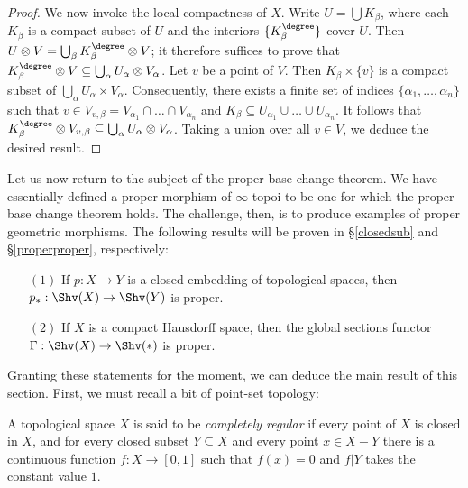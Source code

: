 \begin{proof}
We now invoke the local compactness of $X$.
Write $U = \bigcup K_{\beta}$, where each $K_{\beta}$ is a compact subset of $U$
and the interiors $\{ K^{\degree}_{\beta} \}$ cover $U$.
Then $U \otimes V = \bigcup_{\beta} K^{\degree}_{\beta} \otimes V$; it therefore suffices to prove
that $K^{\degree}_{\beta} \otimes V \subseteq \bigcup_{\alpha} U_{\alpha} \otimes V_{\alpha}$.
Let $v$ be a point of $V$. Then $K_{\beta} \times \{v\}$ is a compact subset of
$\bigcup_{ \alpha} U_{\alpha} \times V_{\alpha}$. Consequently, there exists a finite
set of indices $\{ \alpha_1, \ldots, \alpha_n \}$ such that $v \in V_{v,\beta} = V_{\alpha_1} \cap \ldots \cap V_{\alpha_n}$ and $K_{\beta} \subseteq U_{\alpha_1} \cup \ldots \cup U_{\alpha_n}$. 
It follows that $K^{\degree}_{\beta} \otimes V_{v,\beta} \subseteq \bigcup_{\alpha} U_{\alpha} \otimes V_{\alpha}$. Taking a union over all $v \in V$, we deduce the desired result.
\end{proof}

Let us now return to the subject of the proper base change theorem. We have essentially defined a proper morphism of $\infty$-topoi to be one for which the proper base change theorem holds. The challenge, then, is to produce examples of proper geometric morphisms.
The following results will be proven in \S \ref{closedsub} and \S \ref{properproper}, respectively:

\begin{itemize}
\item[$(1)$] If $p: X \rightarrow Y$ is a closed embedding of topological spaces, then
$p_{\ast}: \Shv(X) \rightarrow \Shv(Y)$ is proper.
\item[$(2)$] If $X$ is a compact Hausdorff space, then the global sections functor
$\Gamma: \Shv(X) \rightarrow \Shv(\ast)$ is proper.
\end{itemize}

Granting these statements for the moment, we can deduce the main result of this section.
First, we must recall a bit of point-set topology:

\begin{definition}
A topological space $X$ is said to be {\it completely regular} if every point of $X$ is closed in $X$, and for every closed subset $Y \subseteq X$ and every point $x \in X-Y$ there is a continuous function $f: X \rightarrow [0,1]$ such that $f(x) = 0$ and $f|Y$ takes the constant value $1$. 
\end{definition}

